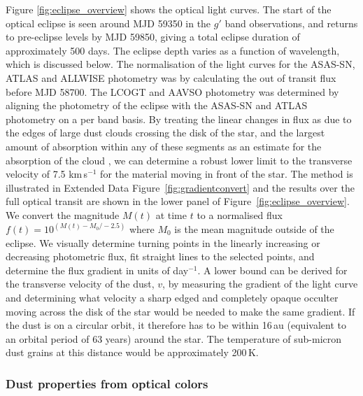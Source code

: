 \documentclass[sn-nature]{sn-jnl}%
\begin{document}
Figure \ref{fig:eclipse_overview} shows the optical light curves. The start of the optical eclipse is seen around MJD 59350 in the $g'$ band observations, and returns to pre-eclipse levels by MJD 59850, giving a total eclipse duration of approximately 500 days. The eclipse depth varies as a function of wavelength, which is discussed below.
%
The normalisation of the light curves for the ASAS-SN, ATLAS and ALLWISE photometry was by calculating the out of transit flux before MJD 58700.
%
The LCOGT and AAVSO photometry was determined by aligning the photometry of the eclipse with the ASAS-SN and ATLAS photometry on a per band basis.
%
By treating the linear changes in flux as due to the edges of large dust clouds crossing the disk of the star, and the largest amount of absorption within any of these segments as an estimate for the absorption of the cloud \citep[see equations 4.2 and 4.3 in ][]{Kennedy17}, we can determine a robust lower limit to the transverse velocity of 7.5 km\,s$^{-1}$ for the material moving in front of the star. The method is illustrated in Extended Data Figure~\ref{fig:gradientconvert} and the results over the full optical transit are shown in the lower panel of Figure~\ref{fig:eclipse_overview}.
%
We convert the magnitude $M(t)$ at time $t$ to a normalised flux $f(t)=10^{(M(t)-M_0/-2.5)}$ where $M_0$ is the mean magnitude outside of the eclipse.
%
We visually determine turning points in the linearly increasing or decreasing photometric flux, fit straight lines to the selected points, and determine the flux gradient in units of day$^{-1}$.
%
A lower bound can be derived for the transverse velocity of the dust, $v$, by measuring the gradient of the light curve and determining what velocity a sharp edged and completely opaque occulter moving across the disk of the star would be needed to make the same gradient.
%
If the dust is on a circular orbit, it therefore has to be within 16\,au (equivalent to an orbital period of 63 years) around the star. The temperature of sub-micron dust grains at this distance would be approximately 200\,K.

\subsubsection*{Dust properties from optical colors}
\end{document}
